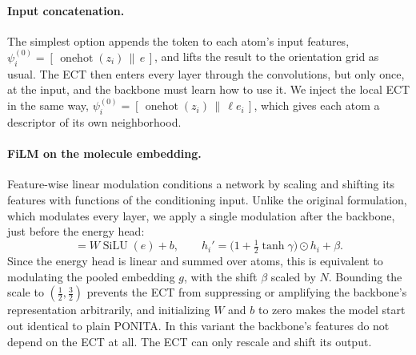 \documentclass{article}
\newcommand{\onehot}{\operatorname{onehot}}
\newcommand{\SiLU}{\operatorname{SiLU}}
\begin{document}
\paragraph{Input concatenation.}
The simplest option appends the token to each atom's input features, $\psi_i^{(0)} = [\,\onehot(z_i) \,\|\, e\,]$, and lifts the result to the orientation grid as usual. The ECT then enters every layer through the convolutions, but only once, at the input, and the backbone must learn how to use it. We inject the local ECT in the same way, $\psi_i^{(0)} = [\,\onehot(z_i) \,\|\, \ell e_i\,]$, which gives each atom a descriptor of its own neighborhood.

\paragraph{FiLM on the molecule embedding.}
Feature-wise linear modulation \citep{perez2018film} conditions a network by scaling and shifting its features with functions of the conditioning input. Unlike the original formulation, which modulates every layer, we apply a single modulation after the backbone, just before the energy head:
\begin{equation}
  [\gamma,\beta] = W\SiLU(e) + b, \qquad h_i' = \big(1 + \tfrac12\tanh\gamma\big)\odot h_i + \beta.
  \label{eq:film}
\end{equation}
Since the energy head is linear and summed over atoms, this is equivalent to modulating the pooled embedding $g$, with the shift $\beta$ scaled by $N$. Bounding the scale to $(\frac12,\frac32)$ prevents the ECT from suppressing or amplifying the backbone's representation arbitrarily, and initializing $W$ and $b$ to zero makes the model start out identical to plain PONITA. In this variant the backbone's features do not depend on the ECT at all. The ECT can only rescale and shift its output.
\end{document}
